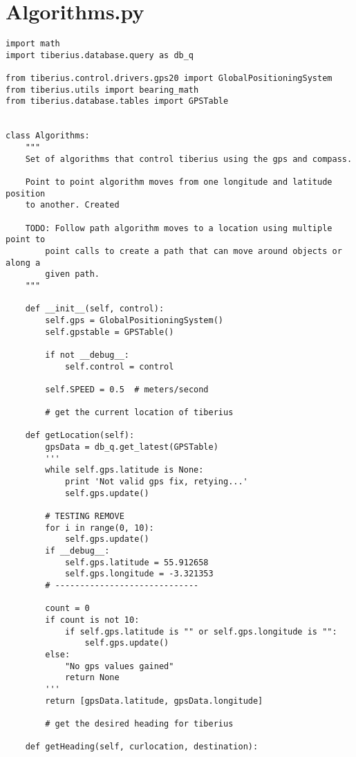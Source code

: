 \chapter{Algorithms.py}
\label{app:Algorithms}
\pagestyle{stuart}

\begin{lstlisting}[style=custompython, label=Algorithms-code, caption=full code for the Algorithms class]
import math
import tiberius.database.query as db_q

from tiberius.control.drivers.gps20 import GlobalPositioningSystem
from tiberius.utils import bearing_math
from tiberius.database.tables import GPSTable


class Algorithms:
    """
    Set of algorithms that control tiberius using the gps and compass.

    Point to point algorithm moves from one longitude and latitude position
    to another. Created

    TODO: Follow path algorithm moves to a location using multiple point to
        point calls to create a path that can move around objects or along a
        given path.
    """

    def __init__(self, control):
        self.gps = GlobalPositioningSystem()
        self.gpstable = GPSTable()

        if not __debug__:
            self.control = control

        self.SPEED = 0.5  # meters/second

        # get the current location of tiberius

    def getLocation(self):
        gpsData = db_q.get_latest(GPSTable)
        '''
        while self.gps.latitude is None:
            print 'Not valid gps fix, retying...'
            self.gps.update()

        # TESTING REMOVE
        for i in range(0, 10):
            self.gps.update()
        if __debug__:
            self.gps.latitude = 55.912658
            self.gps.longitude = -3.321353
        # -----------------------------

        count = 0
        if count is not 10:
            if self.gps.latitude is "" or self.gps.longitude is "":
                self.gps.update()
        else:
            "No gps values gained"
            return None
        '''
        return [gpsData.latitude, gpsData.longitude]

        # get the desired heading for tiberius

    def getHeading(self, curlocation, destination):


\end{lstlisting}
